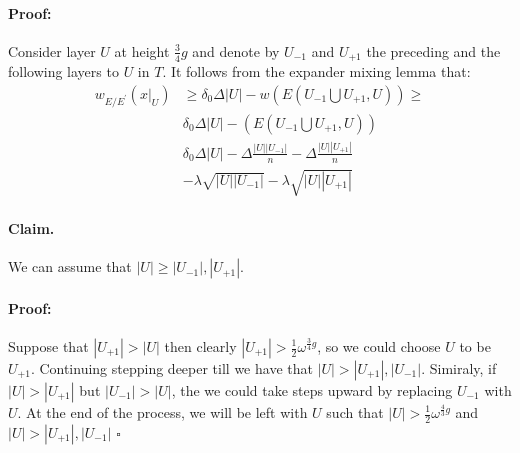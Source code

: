 \documentclass{article}
\begin{document}
\begin{multicols*}{2}
\paragraph{Proof:} Consider layer $U$ at height $\frac{3}{4}g$ and denote by $U_{-1}$ and $U_{+1}$ the preceding and the following layers to $U$ in $T$. It follows from the expander mixing lemma that:
\begin{equation*}
  \begin{split}
    w_{E/E^{\prime}}\left( x|_{U} \right) & \ge \delta_{0}\Delta|U| -w\left( E(U_{-1} \bigcup U_{+1} ,U)  \right) \ge \\ 
    & \delta_{0}\Delta|U| -\left( E(U_{-1} \bigcup U_{+1} ,U)  \right) \\ 
    &  \delta_{0}\Delta|U| - \Delta\frac{|U||U_{-1}|}{n} - \Delta\frac{|U||U_{+1}|}{n} \\
    & -\lambda\sqrt{|U||U_{-1}|} - \lambda\sqrt{|U||U_{+1}|}
  \end{split}
\end{equation*}

\paragraph{Claim.} We can assume that $|U| \ge |U_{-1}|, |U_{+1}|$. 
\paragraph{Proof:} Suppose that $|U_{+1}| > |U|$ then clearly $|U_{+1}| > \frac{1}{2}\omega^{\frac{3}{4}g} $, so we could choose $U$ to be $U_{+1}$. Continuing stepping deeper till we have that $|U| > |U_{+1}|, |U_{-1}|$. Simiraly, if $|U| > |U_{+1}|$ but $|U_{-1}| > |U|$, the we could take steps upward by replacing $U_{-1}$ with $U$. At the end of the process, we will be left with $U$ such that $|U| > \frac{1}{2}\omega^{\frac{4}{3}g}$ and $|U| > |U_{+1}|, |U_{-1}|$ $\square$


\end{multicols*}
\end{document}
